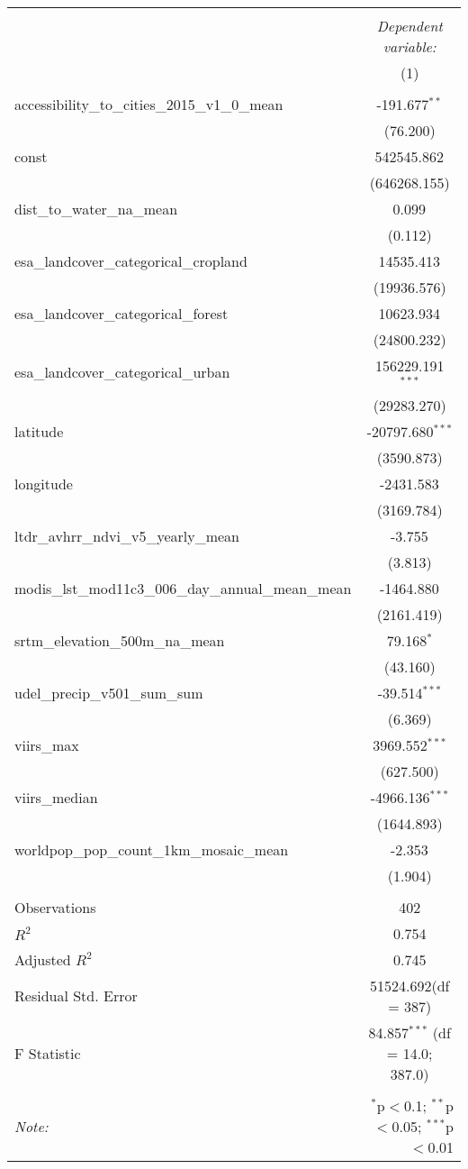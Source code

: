 \begin{table}[!htbp] \centering
\begin{tabular}{@{\extracolsep{5pt}}lc}
\\[-1.8ex]\hline
\hline \\[-1.8ex]
& \multicolumn{1}{c}{\textit{Dependent variable:}} \
\cr \cline{1-2}
\\[-1.8ex] & (1) \\
\hline \\[-1.8ex]
 accessibility_to_cities_2015_v1_0_mean & -191.677$^{**}$ \\
  & (76.200) \\
 const & 542545.862$^{}$ \\
  & (646268.155) \\
 dist_to_water_na_mean & 0.099$^{}$ \\
  & (0.112) \\
 esa_landcover_categorical_cropland & 14535.413$^{}$ \\
  & (19936.576) \\
 esa_landcover_categorical_forest & 10623.934$^{}$ \\
  & (24800.232) \\
 esa_landcover_categorical_urban & 156229.191$^{***}$ \\
  & (29283.270) \\
 latitude & -20797.680$^{***}$ \\
  & (3590.873) \\
 longitude & -2431.583$^{}$ \\
  & (3169.784) \\
 ltdr_avhrr_ndvi_v5_yearly_mean & -3.755$^{}$ \\
  & (3.813) \\
 modis_lst_mod11c3_006_day_annual_mean_mean & -1464.880$^{}$ \\
  & (2161.419) \\
 srtm_elevation_500m_na_mean & 79.168$^{*}$ \\
  & (43.160) \\
 udel_precip_v501_sum_sum & -39.514$^{***}$ \\
  & (6.369) \\
 viirs_max & 3969.552$^{***}$ \\
  & (627.500) \\
 viirs_median & -4966.136$^{***}$ \\
  & (1644.893) \\
 worldpop_pop_count_1km_mosaic_mean & -2.353$^{}$ \\
  & (1.904) \\
\hline \\[-1.8ex]
 Observations & 402 \\
 $R^2$ & 0.754 \\
 Adjusted $R^2$ & 0.745 \\
 Residual Std. Error & 51524.692(df = 387)  \\
 F Statistic & 84.857$^{***}$ (df = 14.0; 387.0) \\
\hline
\hline \\[-1.8ex]
\textit{Note:} & \multicolumn{1}{r}{$^{*}$p$<$0.1; $^{**}$p$<$0.05; $^{***}$p$<$0.01} \\
\end{tabular}
\end{table}